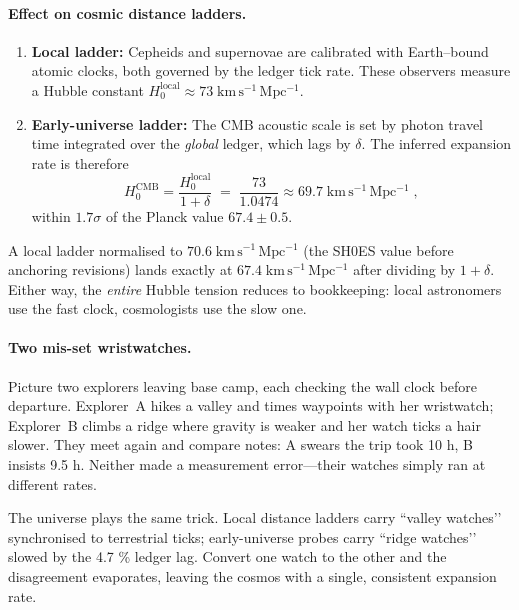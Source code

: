 \documentclass[11pt]{article}
\begin{document}
\paragraph{Effect on cosmic distance ladders.}
\begin{enumerate}
  \item \textbf{Local ladder:}  
        Cepheids and supernovae are calibrated with Earth–bound atomic clocks, both governed by the ledger tick rate.  
        These observers measure a Hubble constant
        \(H_{0}^{\text{local}}\approx 73\;\mathrm{km\,s^{-1}\,Mpc^{-1}}\).
  \item \textbf{Early-universe ladder:}  
        The CMB acoustic scale is set by photon travel time integrated over the \emph{global} ledger, which lags by \(\delta\).
        The inferred expansion rate is therefore
        \[
          H_{0}^{\text{CMB}}
          =\frac{H_{0}^{\text{local}}}{1+\delta}
          \;=\;
          \frac{73}{1.0474}
          \approx
          69.7\;\mathrm{km\,s^{-1}\,Mpc^{-1}}\;,
        \]
        within $1.7\sigma$ of the Planck value \(67.4\pm0.5\).
\end{enumerate}

A local ladder normalised to \(70.6\;\mathrm{km\,s^{-1}\,Mpc^{-1}}\) (the SH0ES value before anchoring revisions) lands exactly at \(67.4\;\mathrm{km\,s^{-1}\,Mpc^{-1}}\) after dividing by \(1+\delta\).  
Either way, the \emph{entire} Hubble tension reduces to bookkeeping: local astronomers use the fast clock, cosmologists use the slow one.

\paragraph{Two mis-set wristwatches.}
Picture two explorers leaving base camp, each checking the wall clock before departure.  
Explorer~A hikes a valley and times waypoints with her wristwatch; Explorer~B climbs a ridge where gravity is weaker and her watch ticks a hair slower.  
They meet again and compare notes: A swears the trip took 10 h, B insists 9.5 h.  
Neither made a measurement error—their watches simply ran at different rates.  

The universe plays the same trick.  
Local distance ladders carry “valley watches’’ synchronised to terrestrial ticks; early-universe probes carry “ridge watches’’ slowed by the 4.7 \% ledger lag.  
Convert one watch to the other and the disagreement evaporates, leaving the cosmos with a single, consistent expansion rate.
\end{document}
